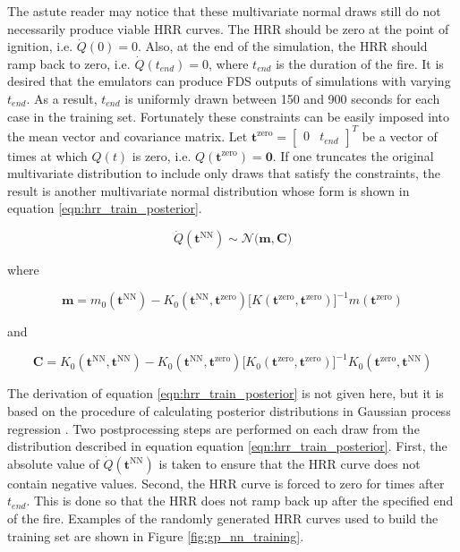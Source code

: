 \documentclass{article}
\begin{document}
The astute reader may notice that these multivariate normal draws still do not necessarily produce viable HRR curves. The HRR should be zero at the point of ignition, i.e. $\dot{Q}(0) = 0$. Also, at the end of the simulation, the HRR should ramp back to zero, i.e. $\dot{Q}(t_{end}) = 0$, where $t_{end}$ is the duration of the fire. It is desired that the emulators can produce FDS outputs of simulations with varying $t_{end}$. As a result, $t_{end}$ is uniformly drawn between 150 and 900 seconds for each case in the training set. Fortunately these constraints can be easily imposed into the mean vector and covariance matrix. Let $\boldsymbol{t}^{\text{zero}} = \begin{bmatrix} 0 & t_{end}  \end{bmatrix}^T$ be a vector of times at which $Q(t)$ is zero, i.e. $Q(\boldsymbol{t}^{\text{zero}}) = \boldsymbol{0}$. If one truncates the original multivariate distribution to include only draws that satisfy the constraints, the result is another multivariate normal distribution whose form is shown in equation \ref{eqn:hrr_train_posterior}. 
 
\begin{equation}
  \label{eqn:hrr_train_posterior}
 \dot{Q}(\boldsymbol{t}^{\text{NN}}) \sim 
 \mathcal{N}\Big(\boldsymbol{m}, \boldsymbol{C}\Big)
\end{equation}

\noindent where 

$$
\boldsymbol{m} = 
m_0(\boldsymbol{t}^{\text{NN}}) -  K_0(\boldsymbol{t}^{\text{NN}}, \boldsymbol{t}^{\text{zero}})\Big[K(\boldsymbol{t}^{\text{zero}}, \boldsymbol{t}^{\text{zero}}) \Big]^{-1} m(\boldsymbol{t}^{\text{zero}})
$$

\noindent and 

$$
\boldsymbol{C} = K_0(\boldsymbol{t}^{\text{NN}}, \boldsymbol{t}^{\text{NN}}) -  K_0( \boldsymbol{t}^{\text{NN}}, \boldsymbol{t}^{\text{zero}})\Big[K_0(\boldsymbol{t}^{\text{zero}}, \boldsymbol{t}^{\text{zero}})\Big]^{-1}K_0(\boldsymbol{t}^{\text{zero}},\boldsymbol{t}^{\text{NN}})
$$

The derivation of equation \ref{eqn:hrr_train_posterior} is not given here, but it is based on the procedure of calculating posterior distributions in Gaussian process regression \cite{rasmussen2003gaussian}. Two postprocessing steps are performed on each draw from the distribution described in equation equation \ref{eqn:hrr_train_posterior}. First, the absolute value of $\dot{Q}(\boldsymbol{t}^{\text{NN}})$ is taken to ensure that the HRR curve does not contain negative values. Second, the HRR curve is forced to zero for times after $t_{end}$. This is done so that the HRR does not ramp back up after the specified end of the fire. Examples of the randomly generated HRR curves used to build the training set are shown in Figure \ref{fig:gp_nn_training}.
\end{document}
